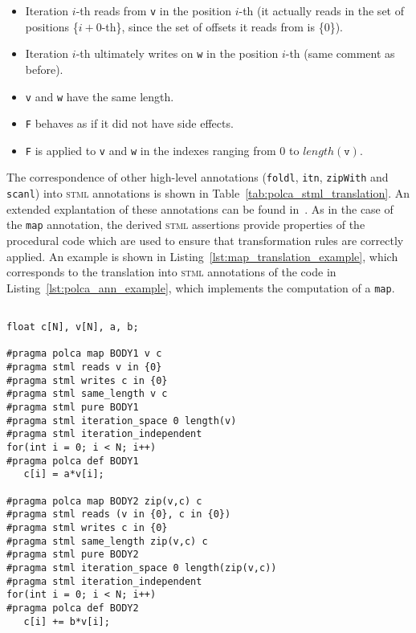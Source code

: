 \documentclass[svgnames,usenames,preprint,nocopyrightspace]{sigplanconf}
\newcommand{\stml}{\textsc{stml}\xspace}
\begin{document}
\begin{itemize}
\item Iteration $i$-th reads from \texttt{v} in the position $i$-th
  (it actually reads in the set of positions \{$i+0$-th\}, since the
  set of offsets it reads from is \{0\}).
\item Iteration $i$-th ultimately writes on \texttt{w} in the position
  $i$-th (same comment as before).
\item \texttt{v} and \texttt{w} have the same length.
\item \texttt{F} behaves as if it did not have side effects.
\item \texttt{F} is applied to \texttt{v} and \texttt{w} in the
  indexes ranging from $0$ to $length(\mathtt{v})$. 
\end{itemize}



The correspondence of other high-level annotations (\texttt{foldl},
\texttt{itn}, \texttt{zipWith} and \texttt{scanl}) into \stml
annotations is shown in Table~\ref{tab:polca_stml_translation}. An extended explantation of these annotations can be found in~\cite{cluster2015}.
As in the case of the \texttt{map} annotation, the derived \stml
assertions provide properties of the procedural code which are used to
ensure that transformation rules are correctly applied.
An example is shown in Listing~\ref{lst:map_translation_example},
which corresponds to the translation into \stml annotations of the
code in Listing~\ref{lst:polca_ann_example}, which implements the
computation of a \texttt{map}.




\begin{lstlisting}[float, caption=Code from Listing \ref{lst:polca_ann_example} after translating high-level annotations to \stml.,label=lst:map_translation_example]

float c[N], v[N], a, b;

#pragma polca map BODY1 v c
#pragma stml reads v in {0}
#pragma stml writes c in {0}
#pragma stml same_length v c
#pragma stml pure BODY1
#pragma stml iteration_space 0 length(v)
#pragma stml iteration_independent
for(int i = 0; i < N; i++)
#pragma polca def BODY1
   c[i] = a*v[i];

#pragma polca map BODY2 zip(v,c) c
#pragma stml reads (v in {0}, c in {0})
#pragma stml writes c in {0}
#pragma stml same_length zip(v,c) c
#pragma stml pure BODY2
#pragma stml iteration_space 0 length(zip(v,c))
#pragma stml iteration_independent
for(int i = 0; i < N; i++)
#pragma polca def BODY2
   c[i] += b*v[i];
\end{lstlisting}
\end{document}
